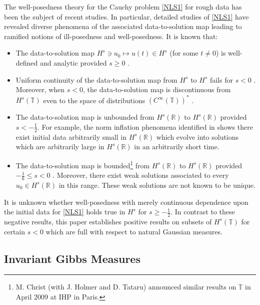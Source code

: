 \documentclass[11pt]{amsart}
\numberwithin{equation}{section} \numberwithin{theorem}{section}
\begin{document}
The well-posedness theory for the Cauchy problem \eqref{NLS1} for rough data has been the subject of recent studies. In particular, detailed studies of \eqref{NLS1} have revealed diverse phenomena of the associated data-to-solution map leading to ramified notions of ill-posedness and well-posedness. It is known that: 
\begin{itemize}
	\item The data-to-solution map $H^s\ni u_0 \longmapsto u(t) \in H^s$ (for some $t \neq 0$) is well-defined and analytic provided $s \geq 0$ \cite{Tsutsumi:1987p799} \cite{Bourgain:1993p453}. 

	\item Uniform continuity of the data-to-solution map from $H^s$ to $H^s$ fails for $s<0$ \cite{Kenig:2001p1478, Burq:2002p911, Christ:2003p838}. Moreover, when $s<0$, the data-to-solution map is discontinuous from $H^s ({\mathbb{T}})$ even to the space of distributions $(C^\infty ({\mathbb{T}}))^*$ \cite{Christ:2003p1180, Molinet:2009p365}. 
	\item The data-to-solution map is unbounded from $H^s ( {\mathbb{R}} )$ to $H^s ( {\mathbb{R}} )$ provided $s < -\frac{1}{2}$. For example, the norm inflation phenomena identified in \cite{Christ:2003p838} shows there exist initial data arbitrarily small in $H^s({\mathbb{R}})$ which evolve into solutions which are arbitrarily large in $H^s({\mathbb{R}})$ in an arbitrarily short time. 
	\item The data-to-solution map is bounded{\footnote{M. Christ (with J. Holmer and D. Tataru) announced similar results on ${\mathbb{T}}$ in April 2009 at IHP in Paris.}} from $H^s ({\mathbb{R}})$ to $H^s({\mathbb{R}})$ provided $-\frac{1}{6} \leq s <0$ \cite{Koch:2007p782}. Moreover, there exist weak solutions associated to every $u_0 \in H^s ({\mathbb{R}})$ in this range. These weak solutions are not known to be unique. 
\end{itemize}
It is unknown whether well-posedness with merely continuous dependence upon the initial data for \eqref{NLS1} holds true in $H^s$ for $s \geq -\frac{1}{2}$. In contrast to these negative results, this paper establishes positive results on subsets of $H^s ({\mathbb{T}})$ for certain $s<0$ which are full with respect to natural Gaussian measures.

\subsection{Invariant Gibbs Measures}
\end{document}
